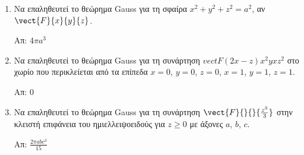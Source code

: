 \documentclass[a4paper,table]{report}
\begin{document}
\thispagestyle{empty}

\begin{center}
\end{center}

\vspace{\baselineskip}

\begin{enumerate}

\item Να επαληθευτεί το θεώρημα \textlatin{Gauss} για τη σφαίρα $x^{2}+y^{2}+z^{2}=a^{2}$, αν $\vect{F}{x}{y}{z}$.

\hfill Απ: $4\pi a^{3}$

\item Να επαληθευτεί το θεώρημα \textlatin{Gauss} για τη συνάρτηση $vect{F}{(2x-z)}{x^{2}y}{xz^{2}}$ στο χωρίο που περικλείεται από τα επίπεδα $x=0$, $y=0$, $z=0$, $x=1$, $y=1$, $z=1$.

\hfill Απ: $0$

\item Να επαληθευτεί το θεώρημα \textlatin{Gauss} για τη συνάρτηση $\vect{F}{}{}{\frac{z^{3}}{3}}$ στην κλειστή επιφάνεια του ημιελλειψοειδούς για $z\geq 0$ με άξονες $a$, $b$, $c$.

\hfill Απ: $\frac{2\pi a b c^{3}}{15}$

\end{enumerate}
\end{document}
